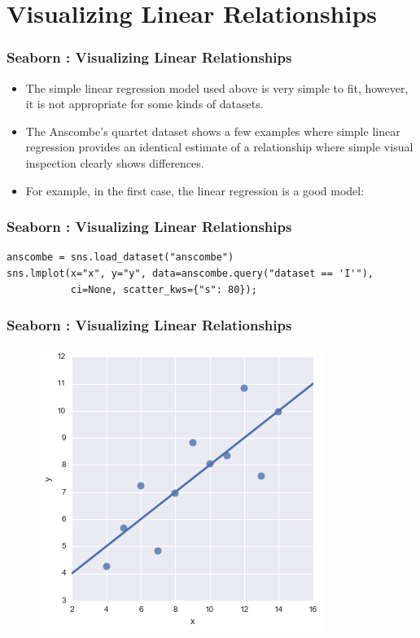 \documentclass{beamer}
\begin{document}
\section{Visualizing Linear Relationships}
\begin{frame}
\frametitle{Seaborn : Visualizing Linear Relationships}
\large
\begin{itemize}
\item The simple linear regression model used above is very simple to fit, however, it is not appropriate for some kinds of datasets. 
\item The Anscombe’s quartet dataset shows a few examples where simple linear regression provides an identical estimate of a relationship where simple visual inspection clearly shows differences. 
\item For example, in the first case, the linear regression is a good model:
\end{itemize}
\end{frame}
\begin{frame}[fragile]
\frametitle{Seaborn : Visualizing Linear Relationships}
\large
\begin{framed}
\begin{verbatim}
anscombe = sns.load_dataset("anscombe")
sns.lmplot(x="x", y="y", data=anscombe.query("dataset == 'I'"),
           ci=None, scatter_kws={"s": 80});
\end{verbatim}
\end{framed}
\end{frame}

    \begin{frame}[fragile]
    	\frametitle{Seaborn : Visualizing Linear Relationships}
    	\large	
\begin{figure}
\centering
\includegraphics[width=0.7\linewidth]{images/regression_19_0}
\end{figure}

\end{frame}
\end{document}
